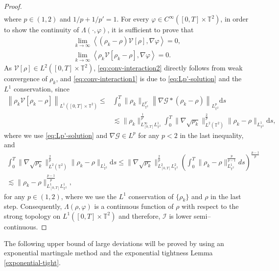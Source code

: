 \begin{proof}
\begin{align}
\end{align}
where $p \in (1,2)$ and $1/p + 1/p' = 1$. For every $\varphi\in C^{\infty}([0,T]\times\mathbb{T}^2)$, in order to show the continuity of $\Lambda(\cdot,\varphi)$, it is sufficient to prove that
\begin{align}
 \lim_{k \to \infty}\left\langle (\rho_{k} - \rho) \mathcal{V}[\rho],\nabla\varphi \right\rangle = 0, \label{eq:conv-interaction1}\\
  \lim_{k \to \infty}\left\langle  \rho_{k} \mathcal{V}[\rho_{k} - \rho],\nabla\varphi \right\rangle = 0.\label{eq:conv-interaction2}
\end{align}
As $\mathcal{V}[\rho] \in L^2([0,T] \times \mathbb{T}^2)$, \eqref{eq:conv-interaction2} directly follows from weak convergence of $\rho_k$, and \eqref{eq:conv-interaction1} is due to \eqref{eq:Lp'-solution} and the $L^1$ conservation, since
\begin{align*}
\left\|\rho_{k} \mathcal{V}[\rho_{k} - \rho]\right\|_{L^1([0,T] \times \mathbb{T}^2)}\leq &\int_{0}^{T}\|\rho_{k}\|_{L^{p'}_{\mathbb{T}^2}} \left\|\nabla \mathcal{G}\ast (\rho_{k}-\rho) \right\|_{L^p_{\mathbb{T}^2}}\mathrm{d}s\\
& \lesssim \|\rho_{k}\|_{L^\infty_{[0,T]}L^1_{\mathbb{T}^2}}^{\frac{1}{p'}}
\int_{0}^{T}\|\nabla\sqrt{\rho_{k}}\|_{L^2(\mathbb{T}^2)}^{\frac{2}{p}}
  \|\rho_{k}-\rho \|_{L^1_{\mathbb{T}^2}}\mathrm{d}s,
\end{align*}
where we use \eqref{eq:Lp'-solution} and $\nabla \mathcal{G} \in L^p$ for any $p < 2$ in the last inequality, and 
\begin{align*}
\int_{0}^{T}\|\nabla\sqrt{\rho_{k}}\|_{L^2(\mathbb{T}^2)}^{\frac{2}{p}}
 \|\rho_{k}-\rho \|_{L^1_{\mathbb{T}^2}}\mathrm{d}s  \leq \|\nabla\sqrt{\rho_{k}}\|_{L^2_{[0,T]}L^2_{\mathbb{T}^2}}^{\frac{2}{p}}
\left(\int_{0}^{T}\|\rho_{k} - \rho\|_{L^1_{\mathbb{T}^2}}^{\frac{p}{p-1}}ds\right)^{\frac{p-1}{p}}\\ 
\lesssim 
\|\rho_{k}-\rho \|_{L^1_{[0,T]}L^1_{\mathbb{T}^2}}^{\frac{p-1}{p}},
\end{align*}
for any $p \in (1,2)$, where we use the $L^1$ conservation of $\{\rho_k\}$ and $\rho$ in the last step.  Consequently, $\Lambda(\rho,\varphi)$ is a continuous function of $\rho$ with respect to the strong topology on $L^1([0,T] \times \mathbb{T}^2)$ and therefore, $\mathcal{I}$ is lower semi--continuous. 
\end{proof}

The following upper bound of large deviations will be proved by using an exponential martingale method and the exponential tightness Lemma \ref{exponential-tight}. 

